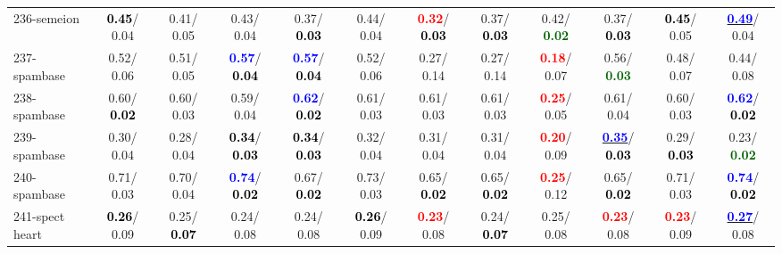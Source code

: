 \begin{table}[h]
\begin{center}
{\begin{tabular}{lc|c|c|c|c|c|c|c|c|c|c}
236-semeion & \textcolor{black}{\textbf{  0.45}}/  0.04 &   0.41/  0.05 &   0.43/  0.04 &   0.37/\textcolor{black}{\textbf{  0.03}} &   0.44/  0.04 & \textcolor{red}{\textbf{  0.32}}/\textcolor{black}{\textbf{  0.03}} &   0.37/\textcolor{black}{\textbf{  0.03}} &   0.42/\textcolor{darkgreen}{\textbf{  0.02}} &   0.37/\textcolor{black}{\textbf{  0.03}} & \textcolor{black}{\textbf{  0.45}}/  0.05 & \underline{\textcolor{blue}{\textbf{  0.49}}}/  0.04 \\
237-spambase &   0.52/  0.06 &   0.51/  0.05 & \textcolor{blue}{\textbf{  0.57}}/\textcolor{black}{\textbf{  0.04}} & \textcolor{blue}{\textbf{  0.57}}/\textcolor{black}{\textbf{  0.04}} &   0.52/  0.06 &   0.27/  0.14 &   0.27/  0.14 & \textcolor{red}{\textbf{  0.18}}/  0.07 &   0.56/\textcolor{darkgreen}{\textbf{  0.03}} &   0.48/  0.07 &   0.44/  0.08 \\
238-spambase &   0.60/\textcolor{black}{\textbf{  0.02}} &   0.60/  0.03 &   0.59/  0.04 & \textcolor{blue}{\textbf{  0.62}}/\textcolor{black}{\textbf{  0.02}} &   0.61/  0.03 &   0.61/  0.03 &   0.61/  0.03 & \textcolor{red}{\textbf{  0.25}}/  0.05 &   0.61/  0.04 &   0.60/  0.03 & \textcolor{blue}{\textbf{  0.62}}/\textcolor{black}{\textbf{  0.02}} \\ \hline
239-spambase &   0.30/  0.04 &   0.28/  0.04 & \textcolor{black}{\textbf{  0.34}}/\textcolor{black}{\textbf{  0.03}} & \textcolor{black}{\textbf{  0.34}}/\textcolor{black}{\textbf{  0.03}} &   0.32/  0.04 &   0.31/  0.04 &   0.31/  0.04 & \textcolor{red}{\textbf{  0.20}}/  0.09 & \underline{\textcolor{blue}{\textbf{  0.35}}}/\textcolor{black}{\textbf{  0.03}} &   0.29/\textcolor{black}{\textbf{  0.03}} &   0.23/\textcolor{darkgreen}{\textbf{  0.02}} \\
240-spambase &   0.71/  0.03 &   0.70/  0.04 & \textcolor{blue}{\textbf{  0.74}}/\textcolor{black}{\textbf{  0.02}} &   0.67/\textcolor{black}{\textbf{  0.02}} &   0.73/  0.03 &   0.65/\textcolor{black}{\textbf{  0.02}} &   0.65/\textcolor{black}{\textbf{  0.02}} & \textcolor{red}{\textbf{  0.25}}/  0.12 &   0.65/\textcolor{black}{\textbf{  0.02}} &   0.71/  0.03 & \textcolor{blue}{\textbf{  0.74}}/\textcolor{black}{\textbf{  0.02}} \\
241-spect heart & \textcolor{black}{\textbf{  0.26}}/  0.09 &   0.25/\textcolor{black}{\textbf{  0.07}} &   0.24/  0.08 &   0.24/  0.08 & \textcolor{black}{\textbf{  0.26}}/  0.09 & \textcolor{red}{\textbf{  0.23}}/  0.08 &   0.24/\textcolor{black}{\textbf{  0.07}} &   0.25/  0.08 & \textcolor{red}{\textbf{  0.23}}/  0.08 & \textcolor{red}{\textbf{  0.23}}/  0.09 & \underline{\textcolor{blue}{\textbf{  0.27}}}/  0.08 \\

\end{tabular}}
\end{center}
\end{table}
